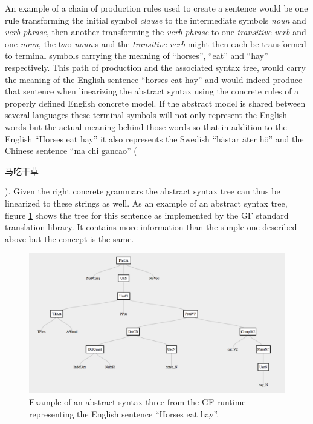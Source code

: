 An example of a chain of production rules used to create a sentence would be one rule transforming the initial symbol \emph{clause} to the intermediate symbols \emph{noun} and \emph{verb phrase}, then another transforming the \emph{verb phrase} to one \emph{transitive verb} and one \emph{noun}, the two \emph{noun}:s and the \emph{transitive verb} might then each be transformed to terminal symbols carrying the meaning of ``horses'', ``eat'' and ``hay'' respectively. This path of production and the associated syntax tree, would carry the meaning of the English sentence ``horses eat hay'' and would indeed produce that sentence when linearizing the abstract syntax using the concrete rules of a properly defined English concrete model. If the abstract model is shared between several languages these terminal symbols will not only represent the English words but the actual meaning behind those words so that in addition to the English ``Horses eat hay'' it also represents the Swedish ``hästar äter hö'' and the Chinese sentence ``ma chi gancao'' (\begin{CJK}{UTF8}{gbsn}马吃干草\end{CJK}). Given the right concrete grammars the abstract syntax tree can thus be linearized to these strings as well. As an example of an abstract syntax tree, figure \ref{fig:ast} shows the tree for this sentence as implemented by the GF standard translation library. It contains more information than the simple one described above but the concept is the same.

\begin{figure}[!htbp]
\includegraphics[width=\linewidth]{figure/ast}
\caption{Example of an abstract syntax three from the GF runtime representing the English sentence ``Horses eat hay''.}
\label{fig:ast}
\end{figure}





